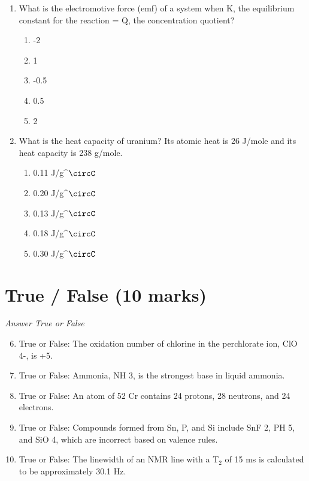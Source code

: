 \documentclass[12pt]{article}
\begin{document}
\begin{enumerate}[label=\arabic*.]
\begin{enumerate}[label=(\alph*)]
\end{enumerate}
\item What is the electromotive force (emf) of a system when K, the equilibrium constant for the reaction = Q, the concentration quotient?
\begin{enumerate}[label=(\alph*)]
    \item -2
    \item 1
    \item -0.5
    \item 0.5
    \item 2
\end{enumerate}
\item What is the heat capacity of uranium? Its atomic heat is 26 J/mole and its heat capacity is 238 g/mole.
\begin{enumerate}[label=(\alph*)]
    \item 0.11 J/g^\ensuremath{\circC}
    \item 0.20 J/g^\ensuremath{\circC}
    \item 0.13 J/g^\ensuremath{\circC}
    \item 0.18 J/g^\ensuremath{\circC}
    \item 0.30 J/g^\ensuremath{\circC}
\end{enumerate}
\end{enumerate}

\section*{True / False (10 marks)}
\textit{Answer True or False}
\begin{enumerate}[label=\arabic*.]
\setcounter{enumi}{5}
\item True or False: The oxidation number of chlorine in the perchlorate ion, ClO 4-, is +5.
\item True or False: Ammonia, NH 3, is the strongest base in liquid ammonia.
\item True or False: An atom of 52 Cr contains 24 protons, 28 neutrons, and 24 electrons.
\item True or False: Compounds formed from Sn, P, and Si include SnF 2, PH 5, and SiO 4, which are incorrect based on valence rules.
\item True or False: The linewidth of an NMR line with a T$_{2}$ of 15 ms is calculated to be approximately 30.1 Hz.
\end{enumerate}
\end{document}
